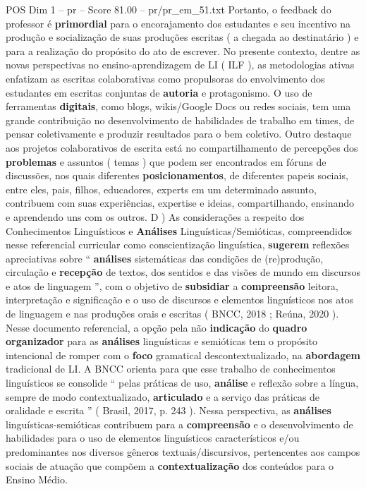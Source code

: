 \begin{textsample}{POS Dim 1 – pr – Score 81.00 – pr/pr\_em\_51.txt}
Portanto, o feedback do professor é \textbf{primordial} para o encorajamento dos estudantes e seu incentivo na produção e socialização de suas produções escritas ( a chegada ao destinatário ) e para a realização do propósito do ato de escrever.
No presente contexto, dentre as novas perspectivas no ensino-aprendizagem de LI ( ILF ), as metodologias ativas enfatizam as escritas colaborativas como propulsoras do envolvimento dos estudantes em escritas conjuntas de \textbf{autoria} e protagonismo.
O uso de ferramentas \textbf{digitais}, como blogs, wikis/Google Docs ou redes sociais, tem uma grande contribuição no desenvolvimento de habilidades de trabalho em times, de pensar coletivamente e produzir resultados para o bem coletivo.
Outro destaque aos projetos colaborativos de escrita está no compartilhamento de percepções dos \textbf{problemas} e assuntos ( temas ) que podem ser encontrados em fóruns de discussões, nos quais diferentes \textbf{posicionamentos}, de diferentes papeis sociais, entre eles, pais, filhos, educadores, experts em um determinado assunto, contribuem com suas experiências, expertise e ideias, compartilhando, ensinando e aprendendo uns com os outros.
D ) As considerações a respeito dos Conhecimentos Linguísticos e \textbf{Análises} Linguísticas/Semióticas, compreendidos nesse referencial curricular como conscientização linguística, \textbf{sugerem} reflexões apreciativas sobre “ \textbf{análises} sistemáticas das condições de (re)produção, circulação e \textbf{recepção} de textos, dos sentidos e das visões de mundo em discursos e atos de linguagem ”, com o objetivo de \textbf{subsidiar} a \textbf{compreensão} leitora, interpretação e significação e o uso de discursos e elementos linguísticos nos atos de linguagem e nas produções orais e escritas ( BNCC, 2018 ; Reúna, 2020 ).
Nesse documento referencial, a opção pela não \textbf{indicação} do \textbf{quadro} \textbf{organizador} para as \textbf{análises} linguísticas e semióticas tem o propósito intencional de romper com o \textbf{foco} gramatical descontextualizado, na \textbf{abordagem} tradicional de LI.
A BNCC orienta para que esse trabalho de conhecimentos linguísticos se consolide “ pelas práticas de uso, \textbf{análise} e reflexão sobre a língua, sempre de modo contextualizado, \textbf{articulado} e a serviço das práticas de oralidade e escrita ” ( Brasil, 2017, p. 243 ).
Nessa perspectiva, as \textbf{análises} linguísticas-semióticas contribuem para a \textbf{compreensão} e o desenvolvimento de habilidades para o uso de elementos linguísticos característicos e/ou predominantes nos diversos gêneros textuais/discursivos, pertencentes aos campos sociais de atuação que compõem a \textbf{contextualização} dos conteúdos para o Ensino Médio.

\end{textsample}
